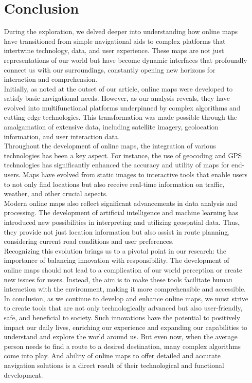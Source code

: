 \documentclass[10pt,oneside,english,a4paper]{article}
\begin{document}
\section{Conclusion} \label{conclusion}
During the exploration, we delved deeper into understanding how online maps have transitioned from simple navigational aids to complex platforms that intertwine technology, data, and user experience. These maps are not just representations of our world but have become dynamic interfaces that profoundly connect us with our surroundings, constantly opening new horizons for interaction and comprehension.
\\Initially, as noted at the outset of our article, online maps were developed to satisfy basic navigational needs. However, as our analysis reveals, they have evolved into multifunctional platforms underpinned by complex algorithms and cutting-edge technologies. This transformation was made possible through the amalgamation of extensive data, including satellite imagery, geolocation information, and user interaction data.
\\Throughout the development of online maps, the integration of various technologies has been a key aspect. For instance, the use of geocoding and GPS technologies has significantly enhanced the accuracy and utility of maps for end-users. Maps have evolved from static images to interactive tools that enable users to not only find locations but also receive real-time information on traffic, weather, and other crucial aspects.
\\Modern online maps also reflect significant advancements in data analysis and processing. The development of artificial intelligence and machine learning has introduced new possibilities in interpreting and utilizing geospatial data. Thus, they provide not just location information but also assist in route planning, considering current road conditions and user preferences.
\\Recognizing this evolution brings us to a pivotal point in our research: the importance of balancing innovation with responsibility. The development of online maps should not lead to a complication of our world perception or create new issues for users. Instead, the aim is to make these tools facilitate human interaction with the environment, making it more comprehensible and accessible.
\\In conclusion, as we continue to develop and enhance online maps, we must strive to create tools that are not only technologically advanced but also user-friendly, safe, and beneficial to society. Such innovations have the potential to positively impact our daily lives, enriching our experience and expanding our capabilities to understand and explore the world around us. But even now, when the average person needs to find a route to a desired destination, many complex algorithms come into play. And ability of online maps to offer detailed and accurate navigation solutions is a direct result of their technological and functional development.



\end{document}
